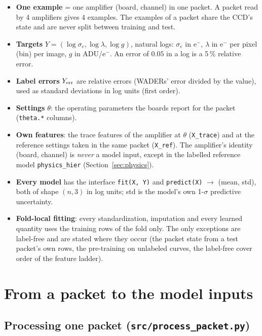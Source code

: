 \documentclass[10pt]{article}
\newcommand{\code}[1]{\texttt{#1}}
\newcommand{\se}{\sigma_e}
\begin{document}
\begin{itemize}
  \item \textbf{One example} = one amplifier (board, channel) in one packet. A packet read by 4 amplifiers gives 4
        examples. The examples of a packet share the CCD's state and are never split between training and test.
  \item \textbf{Targets} $Y = (\log\se, \log\lambda, \log g)$, natural logs: $\se$ in e$^-$, $\lambda$ in e$^-$ per
        pixel (bin) per image, $g$ in ADU/e$^-$. An error of $0.05$ in a log is a 5\,\% relative error.
  \item \textbf{Label errors} $Y_{\rm err}$ are relative errors (WADERs' error divided by the value), used as standard
        deviations in log units (first order).
  \item \textbf{Settings} $\theta$: the operating parameters the boards report for the packet (\code{theta.*} columns).
  \item \textbf{Own features}: the trace features of the amplifier at $\theta$ (\code{X\_trace}) and at the reference
        settings taken in the same packet (\code{X\_ref}). The amplifier's identity (board, channel) is \emph{never} a model
        input, except in the labelled reference model \code{physics\_hier} (Section~\ref{sec:physics}).
  \item \textbf{Every model} has the interface \code{fit(X, Y)} and \code{predict(X)} $\to$ (mean, std), both of shape
        $(n, 3)$ in log units; std is the model's own 1-$\sigma$ predictive uncertainty.
  \item \textbf{Fold-local fitting}: every standardization, imputation and every learned quantity uses the training rows
        of the fold only. The only exceptions are label-free and are stated where they occur (the packet state from a test
        packet's own rows, the pre-training on unlabeled curves, the label-free cover order of the feature ladder).
\end{itemize}

\section{From a packet to the model inputs}
\label{sec:data}

\subsection{Processing one packet (\code{src/process\_packet.py})}
\end{document}

